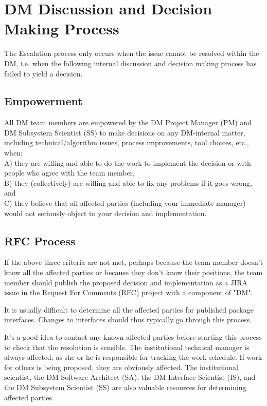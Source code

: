 \section{DM Discussion and Decision Making Process}

The Escalation process only occurs when the issue cannot be resolved within the DM, i.e. when the following internal discussion and decision making process has failed to yield a decision.
\subsection{Empowerment}
All DM team members are empowered by the DM Project Manager (PM) and DM Subsystem  Scientist (SS) to make decisions on any DM-internal matter, including technical/algorithm issues, process improvements, tool choices, etc., when:\\
A) they are willing and able to do the work to implement the decision or with people who agree with the team member,\\
B) they (collectively) are willing and able to fix any problems if it goes wrong, and\\
C) they believe that all affected parties (including your immediate manager) would not seriously object to your decision and implementation.\\

\subsection{RFC Process}
If the above three criteria are not met, perhaps because the team member doesn't know all the affected parties or because they don't know their positions, the team member should publish the proposed decision and implementation as a JIRA issue in the Request For Comments (RFC) project with a component of "DM".

It is usually difficult to determine all the affected parties for published package interfaces. Changes to interfaces should thus typically go through this process.

It's a good idea to contact any known affected parties before starting this process to check that the resolution is sensible. The institutional technical manager is always affected, as she or he is responsible for tracking the work schedule. If work for others is being proposed, they are obviously affected. The institutional scientist, the DM Software Architect (SA), the DM Interface Scientist (IS), and the DM Subsystem  Scientist (SS) are also valuable resources for determining affected parties.

